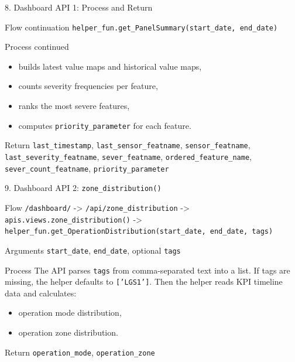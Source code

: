 \documentclass[aspectratio=169]{beamer}
\begin{document}
\begin{frame}{8. Dashboard API 1: Process and Return}
\justifying
\begin{block}{Flow continuation}
\texttt{helper\_fun.get\_PanelSummary(start\_date, end\_date)}
\end{block}

\begin{block}{Process continued}
\begin{itemize}
    \item builds latest value maps and historical value maps,
    \item counts severity frequencies per feature,
    \item ranks the most severe features,
    \item computes \texttt{priority\_parameter} for each feature.
\end{itemize}
\end{block}

\begin{block}{Return}
\small
\texttt{last\_timestamp}, \texttt{last\_sensor\_featname}, \texttt{sensor\_featname}, \texttt{last\_severity\_featname}, \texttt{sever\_featname}, \texttt{ordered\_feature\_name}, \texttt{sever\_count\_featname}, \texttt{priority\_parameter}
\end{block}
\end{frame}

\begin{frame}{9. Dashboard API 2: \texttt{zone\_distribution()}}
\justifying
\begin{block}{Flow}
\texttt{/dashboard/} -> \texttt{/api/zone\_distribution} ->
\texttt{apis.views.zone\_distribution()} ->
\texttt{helper\_fun.get\_OperationDistribution(start\_date, end\_date, tags)}
\end{block}

\begin{block}{Arguments}
\texttt{start\_date}, \texttt{end\_date}, optional \texttt{tags}
\end{block}

\begin{block}{Process}
The API parses \texttt{tags} from comma-separated text into a list.
If tags are missing, the helper defaults to \texttt{['LGS1']}.
Then the helper reads KPI timeline data and calculates:
\begin{itemize}
    \item operation mode distribution,
    \item operation zone distribution.
\end{itemize}
\end{block}

\begin{block}{Return}
\texttt{operation\_mode}, \texttt{operation\_zone}
\end{block}
\end{frame}
\end{document}
